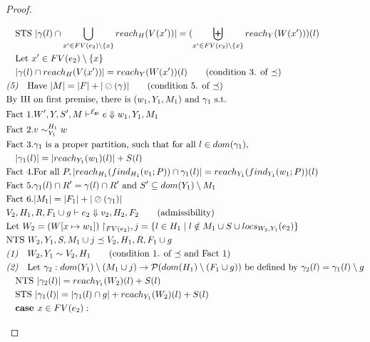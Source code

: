 \documentclass{easychair}
\newcommand{\ms}[1]{\ensuremath{\mathsf{#1}}}
\newcommand{\veq}[4]{#3 \sim^{#1}_{#2} #4}
\newcommand{\oh}[1]{\oslash(#1)}
\newcommand{\gcSem}{\ensuremath{\mathcal{E}_{\ms{gc}}}}
\theoremstyle{definition}
\begin{document}
\begin{proof}
\begin{description}
\begin{align*}
		&\quad \text{STS } |\gamma(l) \cap \bigcup_{x' \in FV(e_2) \setminus \{x\}} reach_H(V(x'))|
			= (\biguplus_{x' \in FV(e_2) \setminus \{x\}} reach_Y(W(x')))(l)\\
		&\quad \text{Let } x' \in FV(e_2) \setminus \{x\}\\
		&\quad |\gamma(l) \cap reach_H(V(x'))| = reach_Y(W(x'))(l) \tag{condition 3. of $\preceq$}\\
		&\emph{(5)}\quad \text{Have } |M| = |F| + |\oh{\gamma}| \tag{condition 5. of $\preceq$}\\
		&\text{By IH on first premise, there is } (w_1,Y_1,M_1) \text{ and } \gamma_1 \text{ s.t. }\\
		&\text{Fact 1}. W',Y,S',M \vdash^{\gcSem} e \Downarrow w_1,Y_1,M_1\\
		&\text{Fact 2}. \veq{H_1}{Y_1}{v}{w}\\
		&\text{Fact 3}. \gamma_1 \text{ is a proper partition, such that for all } l \in dom(\gamma_1),\\
		&\quad|\gamma_1(l)| = |reach_{Y_1}(w_1)(l)| + S(l)\\
		&\text{Fact 4}. \text{For all } P, |reach_{H_1}(find_{H_1}(v_1;P)) \cap \gamma_1(l)| = 
				reach_{Y_1}(find_{Y_1}(w_1;P))(l)\\
		&\text{Fact 5}. \gamma_1(l) \cap R' = \gamma(l) \cap R' \text{ and } 
			S' \subseteq dom(Y_1) \setminus M_1\\
		&\text{Fact 6}. |M_1| = |F_1| + |\oh{\gamma_1}|\\
		&V_2,H_1,R, F_1 \cup g \vdash e_2 \Downarrow v_2,H_2,F_2 \tag{admissibility}\\
		&\text{Let } W_2 = (W[x \mapsto w_1])\restriction_{FV(e_2)}, 
			j = \{ l \in H_1 \mid l \notin M_1 \cup S \cup locs_{W_2,Y_1}(e_2) \}\\
		&\text{NTS } W_2,Y_1,S,M_1 \cup j \preceq V_2,H_1,R, F_1 \cup g\\
		&\emph{(1)}\quad W_2,Y_1 \sim V_2,H_1 \tag{condition 1. of $\preceq$ and Fact 1}\\
		&\emph{(2)}\quad \text{Let } \gamma_2 : dom(Y_1) \setminus (M_1 \cup j) 
			\to \mathcal{P}(dom(H_1)\setminus (F_1 \cup g)) \text{ be defined by } 
			\gamma_2(l) = \gamma_1(l) \setminus g\\
		&\quad \text{NTS } |\gamma_2(l)| = reach_{Y_1}(W_2)(l) + S(l)\\
		&\quad \text{STS } |\gamma_1(l)| = |\gamma_1(l) \cap g| + reach_{Y_1}(W_2)(l) + S(l)\\
		&\quad \textbf{case } x \in FV(e_2):\\

\end{align*}
\end{description}
\end{proof}
\end{document}
